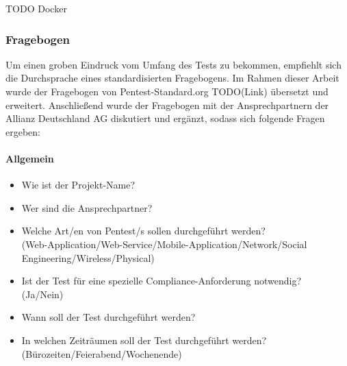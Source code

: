 TODO Docker

\subsubsection{Fragebogen}\label{ref:KategorienUndFragen}
Um einen groben Eindruck vom Umfang des Tests zu bekommen, empfiehlt sich die Durchsprache eines standardisierten Fragebogens. Im Rahmen dieser Arbeit wurde der Fragebogen von Pentest-Standard.org TODO(Link) übersetzt und erweitert. Anschließend wurde der Fragebogen mit der Ansprechpartnern der Allianz Deutschland AG diskutiert und ergänzt, sodass sich folgende Fragen ergeben:

\paragraph{Allgemein}
\begin{itemize}
	\item Wie ist der Projekt-Name?
	\item Wer sind die Ansprechpartner?
	\item Welche Art/en von Pentest/s sollen durchgeführt werden? \\
	(Web-Application/Web-Service/Mobile-Application/Network/Social Engineering/Wireless/Physical)
	\item Ist der Test für eine spezielle Compliance-Anforderung notwendig?\\
	(Ja/Nein)
	\item Wann soll der Test durchgeführt werden?
	\item In welchen Zeiträumen soll der Test durchgeführt werden?\\
	(Bürozeiten/Feierabend/Wochenende)
\end{itemize}

